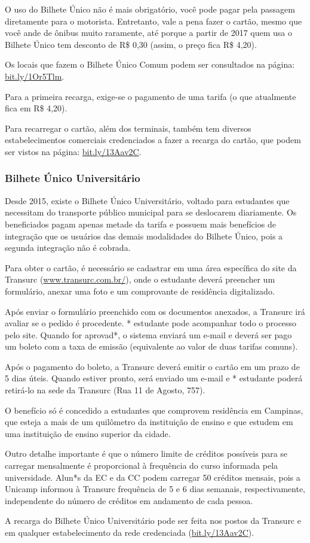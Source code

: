 O uso do Bilhete Único não é mais obrigatório, você pode pagar pela passagem
diretamente para o motorista. Entretanto, vale a pena fazer o cartão, mesmo
que você ande de ônibus muito raramente, até porque a partir de 2017 quem
usa o Bilhete Único tem desconto de R\$ 0,30 (assim, o preço fica R\$ 4,20).

Os locais que fazem o Bilhete Único Comum podem ser consultados na página:
\url{bit.ly/1Or5Tlm}.

Para a primeira recarga, exige-se o pagamento de uma tarifa (o que atualmente
fica em R\$ 4,20).

Para recarregar o cartão, além dos terminais, também tem diversos
estabelecimentos comerciais credenciados a fazer a recarga do cartão, que podem
ser vistos na página: \url{bit.ly/13Aav2C}.

\subsubsection{Bilhete Único Universitário}

Desde 2015, existe o Bilhete Único Universitário, voltado para estudantes que
necessitam do transporte público municipal para se deslocarem diariamente. Os
beneficiados pagam apenas metade da tarifa e possuem mais benefícios de
integração que os usuários das demais modalidades do Bilhete Único, pois a
segunda integração não é cobrada.

Para obter o cartão, é necessário se cadastrar em uma área específica do site
da Transurc (\url{www.transurc.com.br/}), onde o estudante deverá preencher
um formulário, anexar uma foto e um comprovante de residência digitalizado.

Após enviar o formulário preenchido com os documentos anexados, a Transurc
irá avaliar se o pedido é procedente. * estudante pode acompanhar todo o
processo pelo site. Quando for aprovad*, o sistema enviará um e-mail e deverá
ser pago um boleto com a taxa de emissão (equivalente ao valor de duas
tarifas comuns).

Após o pagamento do boleto, a Transurc deverá emitir o cartão em um prazo de
5 dias úteis. Quando estiver pronto, será enviado um e-mail e * estudante
poderá retirá-lo na sede da Transurc (Rua 11 de Agosto, 757).

O benefício só é concedido a estudantes que comprovem residência em Campinas,
que esteja a mais de um quilômetro da instituição de ensino e que estudem em
uma instituição de ensino superior da cidade.

Outro detalhe importante é que o número limite de créditos possíveis para se
carregar mensalmente é proporcional à frequência do curso informada pela
universidade. Alun*s da EC e da CC podem carregar 50 créditos mensais, pois
a Unicamp informou à Transurc frequência de 5 e 6 dias semanais,
respectivamente, independente do número de créditos em andamento de cada
pessoa.

A recarga do Bilhete Único Universitário pode ser feita nos postos da
Transurc e em qualquer estabelecimento da rede credenciada
(\url{bit.ly/13Aav2C}).
